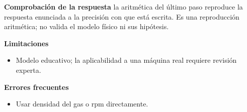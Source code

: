 \documentclass[10pt,openany]{book}
\begin{document}
\begin{tcolorbox}[title={Problema resuelto 1}, studiumworked, breakable]
\noindent\textbf{Comprobación de la respuesta} la aritmética del último paso reproduce la respuesta enunciada a la precisión con que está escrita. Es una reproducción aritmética; no valida el modelo físico ni sus hipótesis.

\noindent\textbf{Limitaciones}
\begin{itemize}
\item Modelo educativo; la aplicabilidad a una máquina real requiere revisión experta.
\end{itemize}

\noindent\textbf{Errores frecuentes}
\begin{itemize}
\item Usar densidad del gas o rpm directamente.
\end{itemize}
\end{tcolorbox}
\end{document}
